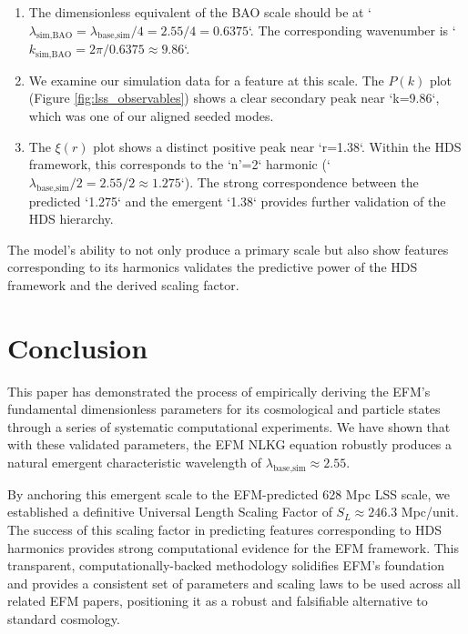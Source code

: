 \documentclass[11pt]{article}
\begin{document}
\begin{enumerate}
    \item The dimensionless equivalent of the BAO scale should be at `$\lambda_{\text{sim,BAO}} = \lambda_{\text{base,sim}} / 4 = 2.55 / 4 = 0.6375$`. The corresponding wavenumber is `$k_{\text{sim,BAO}} = 2\pi / 0.6375 \approx 9.86$`.
    \item We examine our simulation data for a feature at this scale. The $P(k)$ plot (Figure \ref{fig:lss_observables}) shows a clear secondary peak near `k=9.86`, which was one of our aligned seeded modes.
    \item The $\xi(r)$ plot shows a distinct positive peak near `r=1.38`. Within the HDS framework, this corresponds to the `n'=2` harmonic (`$\lambda_{\text{base,sim}} / 2 = 2.55 / 2 \approx 1.275$`). The strong correspondence between the predicted `1.275` and the emergent `1.38` provides further validation of the HDS hierarchy.
\end{enumerate}
The model's ability to not only produce a primary scale but also show features corresponding to its harmonics validates the predictive power of the HDS framework and the derived scaling factor.

\section{Conclusion}
This paper has demonstrated the process of empirically deriving the EFM's fundamental dimensionless parameters for its cosmological and particle states through a series of systematic computational experiments. We have shown that with these validated parameters, the EFM NLKG equation robustly produces a natural emergent characteristic wavelength of $\lambda_{\text{base,sim}} \approx 2.55$.

By anchoring this emergent scale to the EFM-predicted 628 Mpc LSS scale, we established a definitive Universal Length Scaling Factor of $S_L \approx 246.3$ Mpc/unit. The success of this scaling factor in predicting features corresponding to HDS harmonics provides strong computational evidence for the EFM framework. This transparent, computationally-backed methodology solidifies EFM's foundation and provides a consistent set of parameters and scaling laws to be used across all related EFM papers, positioning it as a robust and falsifiable alternative to standard cosmology.
\end{document}
